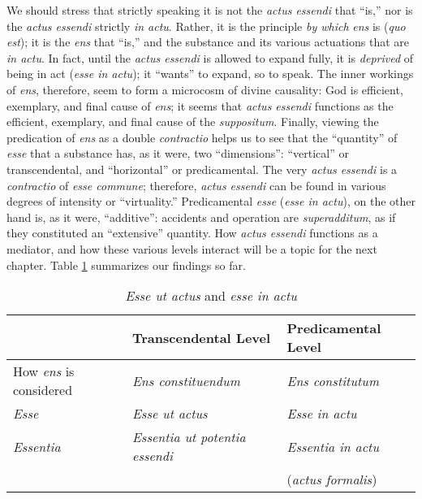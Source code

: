 We should stress that strictly speaking it is not the \emph{actus essendi} that “is,” nor is the \emph{actus essendi} strictly \emph{in actu}. Rather, it is the principle \emph{by which} \emph{ens} is (\emph{quo est}); it is the \emph{ens} that “is,” and the substance and its various actuations that are \emph{in actu}. In fact, until the \emph{actus essendi} is allowed to expand fully, it is \emph{deprived} of being in act (\emph{esse in actu}); it “wants” to expand, so to speak. The inner workings of \emph{ens}, therefore, seem to form a microcosm of divine causality: God is efficient, exemplary, and final cause of \emph{ens}; it seems that \emph{actus essendi} functions as the efficient, exemplary, and final cause of the \emph{suppositum}. Finally, viewing the predication of \emph{ens} as a double \emph{contractio} helps us to see that the “quantity” of \emph{esse} that a substance has, as it were, two “dimensions”: “vertical” or transcendental, and “horizontal” or predicamental. The very \emph{actus essendi} is a \emph{contractio} of \emph{esse commune}; therefore, \emph{actus essendi} can be found in various degrees of intensity or “virtuality.” Predicamental \emph{esse} (\emph{esse in actu}), on the other hand is, as it were, “additive”: accidents and operation are \emph{superadditum}, as if they constituted an “extensive” quantity. How \emph{actus essendi} functions as a mediator, and how these various levels interact will be a topic for the next chapter. Table \ref{tab:esse-ut-actus-in-actu} summarizes our findings so far.

\begin{table}
  \centering
    \begin{tabular}{lll}
      \toprule
        \rule[-6pt]{0pt}{22pt}&
        \textbf{Transcendental Level} &
        \textbf{Predicamental Level} \\
      \midrule
        \rule[-6pt]{0pt}{22pt}How \emph{ens} is considered &
        \emph{Ens constituendum} &
        \emph{Ens constitutum} \\
        \rule[-6pt]{0pt}{22pt}\emph{Esse} &
        \emph{Esse ut actus} &
        \emph{Esse in actu} \\
        \rule{0pt}{16pt}\emph{Essentia} &
        \emph{Essentia ut potentia essendi} &
        \emph{Essentia in actu} \\
        \rule[-6pt]{0pt}{6pt}&
        &
        (\emph{actus formalis}) \\

      \bottomrule
    \end{tabular}%
    \caption{\emph{Esse ut actus} and \emph{esse in actu}}
  \label{tab:esse-ut-actus-in-actu}%
\end{table}%

